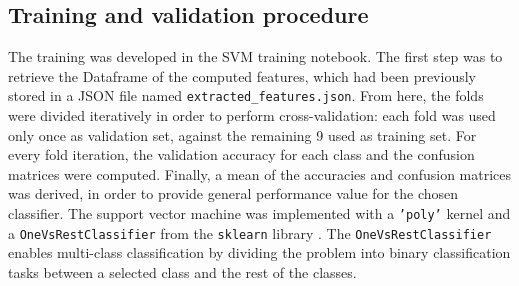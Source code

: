 \documentclass{article}
\newcommand{\code}{\texttt}
\begin{document}
\subsection{Training and validation procedure}
The training was developed in the SVM training notebook. The first step was to retrieve the Dataframe of the computed features, which had been previously stored in a JSON file named \code{extracted\_features.json}. From here, the folds were divided iteratively in order to perform cross-validation: each fold was used only once as validation set, against the remaining 9 used as training set. For every fold iteration, the validation accuracy for each class and the confusion matrices were computed. Finally, a mean of the accuracies and confusion matrices was derived, in order to provide general performance value for the chosen classifier. 
The support vector machine was implemented with a \code{'poly'} kernel and a \code{OneVsRestClassifier} from the \code{sklearn} library \cite{sklearn}. The \code{OneVsRestClassifier} enables multi-class classification by dividing the problem into binary classification tasks between a selected class and the rest of the classes.
\end{document}
